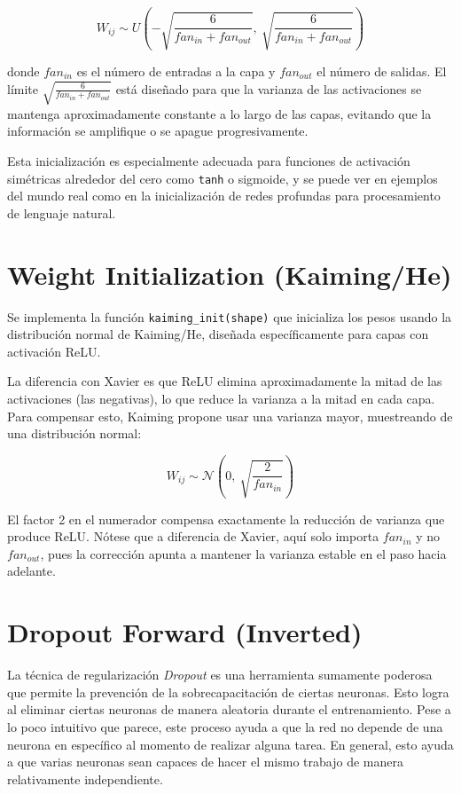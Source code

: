 \documentclass[12pt, letterpaper]{article}
\begin{document}
\[
W_{ij} \sim U\left(-\sqrt{\frac{6}{fan_{in} + fan_{out}}},\ \sqrt{\frac{6}{fan_{in} + fan_{out}}}\right)
\]

donde $fan_{in}$ es el número de entradas a la capa y $fan_{out}$ el número de
salidas. El límite $\sqrt{\frac{6}{fan_{in} + fan_{out}}}$ está diseñado para
que la varianza de las activaciones se mantenga aproximadamente constante a lo
largo de las capas, evitando que la información se amplifique o se apague
progresivamente.

Esta inicialización es especialmente adecuada para funciones de activación
simétricas alrededor del cero como \texttt{tanh} o sigmoide, y se puede ver
en ejemplos del mundo real como en la inicialización de redes profundas para
procesamiento de lenguaje natural.

\newpage

\section{Weight Initialization (Kaiming/He)}

Se implementa la función \texttt{kaiming\_init(shape)} que inicializa los pesos
usando la distribución normal de Kaiming/He, diseñada específicamente para
capas con activación ReLU.

La diferencia con Xavier es que ReLU elimina aproximadamente la mitad de las
activaciones (las negativas), lo que reduce la varianza a la mitad en cada capa.
Para compensar esto, Kaiming propone usar una varianza mayor, muestreando de
una distribución normal:

\[
W_{ij} \sim \mathcal{N}\left(0,\ \sqrt{\frac{2}{fan_{in}}}\right)
\]

El factor 2 en el numerador compensa exactamente la reducción de varianza que
produce ReLU. Nótese que a diferencia de Xavier, aquí solo importa $fan_{in}$
y no $fan_{out}$, pues la corrección apunta a mantener la varianza estable en
el paso hacia adelante.

\newpage

\section{Dropout Forward (Inverted)}

La técnica de regularización \textit{Dropout} es una herramienta sumamente poderosa que permite la prevención de la sobrecapacitación de ciertas neuronas. Esto logra al eliminar ciertas neuronas de manera aleatoria durante el entrenamiento. Pese a lo poco intuitivo que parece, este proceso ayuda a que la red no depende de una neurona en específico al momento de realizar alguna tarea. En general, esto ayuda a que varias neuronas sean capaces de hacer el mismo trabajo de manera relativamente independiente. 
\end{document}
